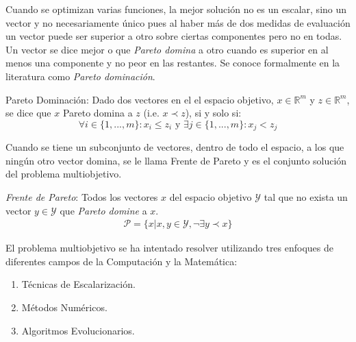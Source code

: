 Cuando se optimizan varias funciones, la mejor soluci\'on  no es un escalar, sino un vector y no necesariamente \'unico pues al haber m\'as de dos medidas de evaluaci\'on un vector puede ser superior a otro sobre ciertas componentes pero no en todas. Un vector se dice mejor o que \textit{Pareto domina} a otro cuando es superior en al menos una componente y no peor en las restantes. Se conoce formalmente en la literatura como \textit{Pareto dominaci\'on}.
\begin{definition}{Pareto Dominaci\'on:}
    \label{background:def:domintation}
    Dado dos vectores en el el espacio objetivo, $x \in \mathbb{R}^m$ y $z \in \mathbb{R}^m$, se dice que $x$ Pareto domina a $z$ (i.e. $x \prec z$), si y solo si:
    \begin{equation*}
        \forall i \in \{1, ..., m\}: x_i \leq z_i \text{ y } \exists j \in \{1, ..., m\}: x_j < z_j
    \end{equation*}
\end{definition}

Cuando se tiene un subconjunto de vectores, dentro de todo el espacio,  a los que ning\'un otro vector domina, se le  llama Frente de Pareto y es el conjunto soluci\'on del problema multiobjetivo.

\begin{definition}
    \label{background:def:pareto_front}
    \textit{Frente de Pareto}: Todos los vectores $x$ del espacio objetivo $\mathcal{Y}$ tal que no exista un vector $y \in \mathcal{Y}$ que \textit{Pareto domine} a $x$.
    \begin{align*}
        \mathcal{P} = \{x| x, y \in \mathcal{Y}, \neg \exists y \prec x \} 
    \end{align*}
\end{definition}



El problema multiobjetivo se ha intentado resolver utilizando tres enfoques de diferentes campos de la Computaci\'on y la Matem\'atica:
\begin{enumerate}
    \item T\'ecnicas de Escalarizaci\'on.
    \item M\'etodos Num\'ericos.
    \item Algoritmos Evolucionarios.
\end{enumerate}



